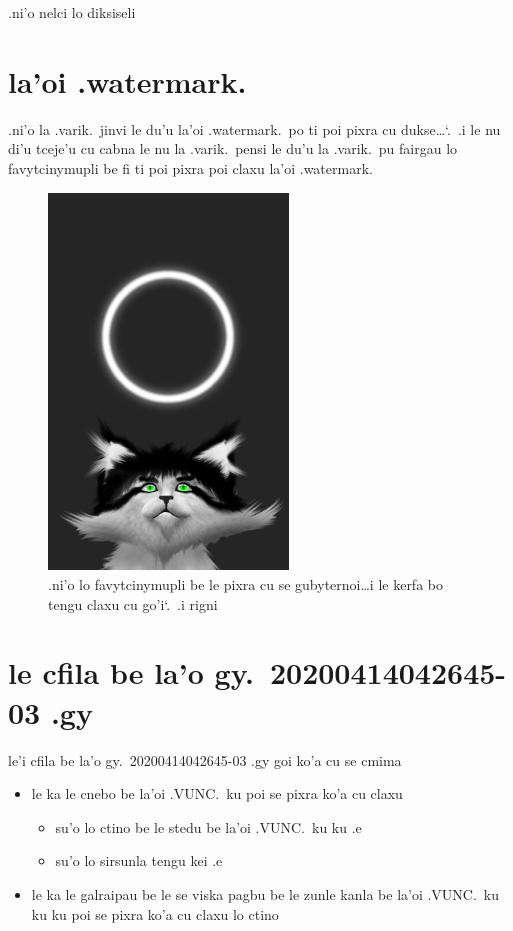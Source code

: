 \documentclass{report}
\newcommand\sds{\spacefactor\sfcode`.\ \space}
\begin{document}
.ni'o nelci lo diksiseli

\section{la'oi .watermark.}
.ni'o la .varik.\ jinvi le du'u la'oi .watermark.\ po ti poi pixra cu dukse\ldots\sds .i le nu di'u tceje'u cu cabna le nu la .varik.\ pensi le du'u la .varik.\ pu fairgau lo favytcinymupli be fi ti poi pixra poi claxu la'oi .watermark.

\begin{figure}[ht]
	\centering
	\includegraphics[height=10cm]{20200414042645-03/20200414042645-03-uw.png}
	\caption[center]{.ni'o lo favytcinymupli be le pixra cu se gubyternoi\ldots i le kerfa bo tengu claxu cu go'i\sds  .i rigni}
\end{figure}

\section{le cfila be la'o gy.\ 20200414042645-03 .gy}
le'i cfila be la'o gy.\ 20200414042645-03 .gy goi ko'a cu se cmima
\begin{itemize}
	\item le ka le cnebo be la'oi .VUNC.\ ku poi se pixra ko'a cu claxu
	\begin{itemize}
		\item su'o lo ctino be le stedu be la'oi .VUNC.\ ku ku .e
		\item su'o lo sirsunla tengu kei .e
	\end{itemize}
	\item le ka le galraipau be le se viska pagbu be le zunle kanla be la'oi .VUNC.\ ku ku ku poi se pixra ko'a cu claxu lo ctino
\end{itemize}
\end{document}
